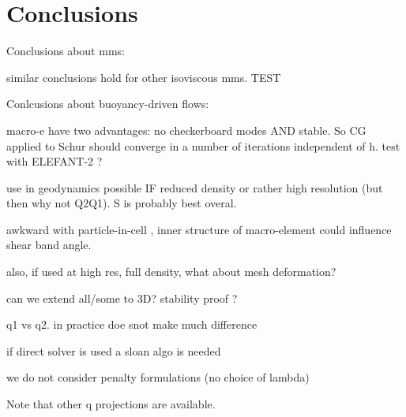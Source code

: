 \documentclass[a4paper]{article}
\begin{document}
\section{Conclusions}\label{sec5}

Conclusions about mms:

similar conclusions hold for other isoviscous mms. TEST




Conlcusions about buoyancy-driven flows:

macro-e have two advantages: no checkerboard modes AND stable. So CG applied to Schur should converge in a number of iterations independent of h. test with ELEFANT-2 ?

use in geodynamics possible IF reduced density or rather high resolution (but then why not Q2Q1). S is probably best overal.

awkward with particle-in-cell , inner structure of macro-element could influence shear band angle. 

also, if used at high res, full density, what about mesh deformation?

can we extend all/some to 3D? stability proof ?

q1 vs q2. in practice doe snot make much difference

if direct solver is used a sloan algo is needed

we do not consider penalty formulations (no choice of lambda)

Note that other q projections are available.





\printbibliography
\end{document}
